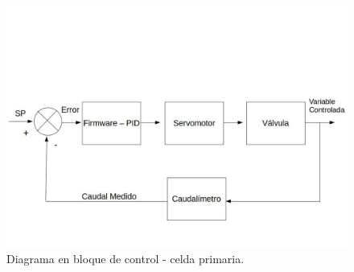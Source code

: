 %  
\begin{figure}[h]
\centering
\includegraphics[scale=.45]{./Figures/DiagramaEnBloqueDeControlCeldaPrimaria-V4.jpg}
\caption{Diagrama en bloque de control - celda primaria.}
\label{fig:CeldaPrimaria}
\end{figure}

